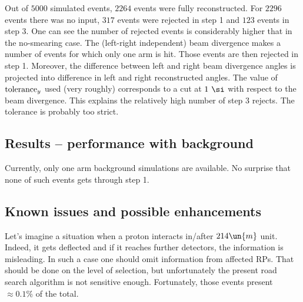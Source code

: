 

Out of $5000$ simulated events, $2264$ events were fully reconstructed. For $2296$ events there was no input, $317$ events were rejected in step 1 and $123$ events in step 3. One can see the number of rejected events is considerably higher that in the no-smearing case. The (left-right independent) beam divergence makes a number of events for which only one arm is hit. Those events are then rejected in step 1. Moreover, the difference between left and right beam divergence angles is projected into difference in left and right reconstructed angles. The value of ${\rm tolerance}_y$ used (very roughly) corresponds to a cut at $1\ \si$ with respect to the beam divergence. This explains the relatively high number of step 3 rejects. The tolerance is probably too strict.

\subsection{Results -- performance with background}

Currently, only one arm background simulations are available. No surprise that none of such events gets through step 1.


\subsection{Known issues and possible enhancements}

Let's imagine a situation when a proton interacts in/after $214\un{m}$ unit. Indeed, it gets deflected and if it reaches further detectors, the information is misleading. In such a case one should omit information from affected RPs. That should be done on the level of selection, but unfortunately the present road search algorithm is not sensitive enough. Fortunately, those events present $\approx 0.1\%$ of the total.

\iffalse
In order to avoid those problems, it is necessary to improve the selection algorithm. Instead of road search algorithm, one can use a proper pattern recognition algorithm with pattern defined by \Eq{track general}. This can be implemented on the level of elastic reconstruction or better a lever lower. Instead of (current) selecting hits RP by RP, this might be done using all hits available. This might be very useful in the case a detector has more than one hit. Using information from other detectors, one may remove the ambiguity in pairing $u$ and $v$ strips. This needs to be discussed.
\fi

